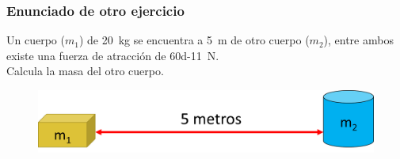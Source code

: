 \documentclass[14pt]{beamer}
\begin{document}
\begin{frame}
\frametitle{Enunciado de otro ejercicio}
Un cuerpo ($m_{1}$) de \SI{20}{\kilogram} se encuentra a \SI{5}{\meter} de otro cuerpo ($m_{2}$), entre ambos existe una fuerza de atracción de \SI{60d-11}{\newton}.
\\
\bigskip
\pause
Calcula la masa del otro cuerpo.
\begin{figure}
    \centering
    \includegraphics[scale=0.75]{Imagenes/Gravitacion_Universal_02.png}
\end{figure}
\end{frame}

    
\end{document}
